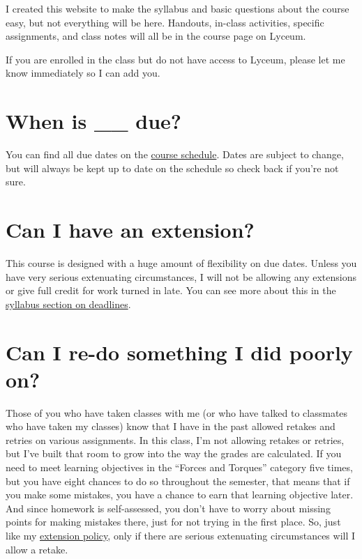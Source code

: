 \documentclass[
  letterpaper,
  DIV=11,
  numbers=noendperiod]{scrartcl}
\begin{document}
I created this website to make the syllabus and basic questions about
the course easy, but not everything will be here. Handouts, in-class
activities, specific assignments, and class notes will all be in the
course page on Lyceum.

If you are enrolled in the class but do not have access to Lyceum,
please let me know immediately so I can add you.

\section{When is \_\_ due?}\label{duedates}

You can find all due dates on the
\href{https://docs.google.com/spreadsheets/d/1YAsNtwv3fVJGBB0jJE1co742owqrAibKPeEpugopHsM/edit?usp=sharing}{course
schedule}. Dates are subject to change, but will always be kept up to
date on the schedule so check back if you're not sure.

\section{Can I have an extension?}\label{extensionpolicy}

This course is designed with a huge amount of flexibility on due dates.
Unless you have very serious extenuating circumstances, I will not be
allowing any extensions or give full credit for work turned in late. You
can see more about this in the \href{syllabus.qmd\#deadlines}{syllabus
section on deadlines}.

\section{Can I re-do something I did poorly on?}\label{revisionpolicy}

Those of you who have taken classes with me (or who have talked to
classmates who have taken my classes) know that I have in the past
allowed retakes and retries on various assignments. In this class, I'm
not allowing retakes or retries, but I've built that room to grow into
the way the grades are calculated. If you need to meet learning
objectives in the ``Forces and Torques'' category five times, but you
have eight chances to do so throughout the semester, that means that if
you make some mistakes, you have a chance to earn that learning
objective later. And since homework is self-assessed, you don't have to
worry about missing points for making mistakes there, just for not
trying in the first place. So, just like my
\hyperref[extensions]{extension policy}, only if there are serious
extenuating circumstances will I allow a retake.
\end{document}

